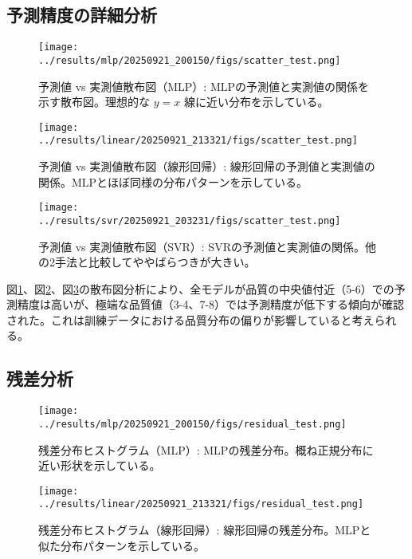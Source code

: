 \documentclass[12pt,a4paper,dvipdfmx]{jsarticle}
\begin{document}
\subsection{予測精度の詳細分析}

\begin{figure}[H]
\centering
\texttt{[image: ../results/mlp/20250921\_200150/figs/scatter\_test.png]}
\caption{予測値 vs 実測値散布図（MLP）: MLPの予測値と実測値の関係を示す散布図。理想的な $y=x$ 線に近い分布を示している。}
\label{fig:mlp_scatter}
\end{figure}

\begin{figure}[H]
\centering
\texttt{[image: ../results/linear/20250921\_213321/figs/scatter\_test.png]}
\caption{予測値 vs 実測値散布図（線形回帰）: 線形回帰の予測値と実測値の関係。MLPとほぼ同様の分布パターンを示している。}
\label{fig:linear_scatter}
\end{figure}

\begin{figure}[H]
\centering
\texttt{[image: ../results/svr/20250921\_203231/figs/scatter\_test.png]}
\caption{予測値 vs 実測値散布図（SVR）: SVRの予測値と実測値の関係。他の2手法と比較してややばらつきが大きい。}
\label{fig:svr_scatter}
\end{figure}

図\ref{fig:mlp_scatter}、図\ref{fig:linear_scatter}、図\ref{fig:svr_scatter}の散布図分析により、全モデルが品質の中央値付近（5-6）での予測精度は高いが、極端な品質値（3-4、7-8）では予測精度が低下する傾向が確認された。これは訓練データにおける品質分布の偏りが影響していると考えられる。

\subsection{残差分析}

\begin{figure}[H]
\centering
\texttt{[image: ../results/mlp/20250921\_200150/figs/residual\_test.png]}
\caption{残差分布ヒストグラム（MLP）: MLPの残差分布。概ね正規分布に近い形状を示している。}
\label{fig:mlp_residual}
\end{figure}

\begin{figure}[H]
\centering
\texttt{[image: ../results/linear/20250921\_213321/figs/residual\_test.png]}
\caption{残差分布ヒストグラム（線形回帰）: 線形回帰の残差分布。MLPと似た分布パターンを示している。}
\label{fig:linear_residual}
\end{figure}
\end{document}
